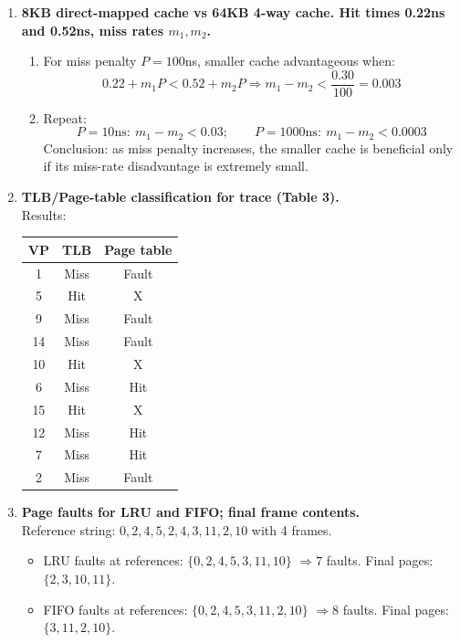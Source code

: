 \documentclass[11pt]{article}
\begin{document}
\begin{enumerate}
\item \textbf{8KB direct-mapped cache vs 64KB 4-way cache. Hit times 0.22ns and 0.52ns, miss rates $m_1,m_2$.}
\begin{enumerate}[label=(\alph*)]
\item For miss penalty $P=100$ns, smaller cache advantageous when:
\[
0.22+m_1P < 0.52+m_2P \Rightarrow m_1-m_2 < \frac{0.30}{100}=\boxed{0.003}
\]
\item Repeat:
\[
P=10\text{ns}:\ m_1-m_2<\boxed{0.03};\qquad P=1000\text{ns}:\ m_1-m_2<\boxed{0.0003}
\]
Conclusion: as miss penalty increases, the smaller cache is beneficial only if its miss-rate disadvantage is extremely small.
\end{enumerate}

\item \textbf{TLB/Page-table classification for trace (Table 3).}\\
Results:
\begin{center}
\begin{tabular}{c|c|c}
VP & TLB & Page table \\\hline
1 & Miss & Fault \\
5 & Hit & X \\
9 & Miss & Fault \\
14 & Miss & Fault \\
10 & Hit & X \\
6 & Miss & Hit \\
15 & Hit & X \\
12 & Miss & Hit \\
7 & Miss & Hit \\
2 & Miss & Fault \\
\end{tabular}
\end{center}

\item \textbf{Page faults for LRU and FIFO; final frame contents.}\\
Reference string: $0,2,4,5,2,4,3,11,2,10$ with 4 frames.
\begin{itemize}
\item LRU faults at references: $\{0,2,4,5,3,11,10\}$ $\Rightarrow \boxed{7}$ faults. Final pages: $\boxed{\{2,3,10,11\}}$.
\item FIFO faults at references: $\{0,2,4,5,3,11,2,10\}$ $\Rightarrow \boxed{8}$ faults. Final pages: $\boxed{\{3,11,2,10\}}$.
\end{itemize}
\end{enumerate}
\end{document}
